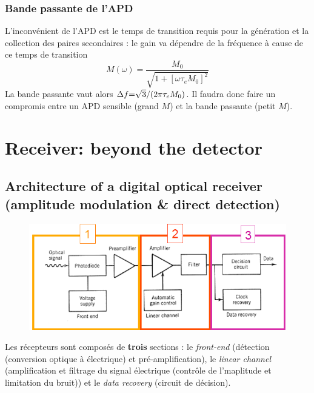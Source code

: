 \subsubsection{Bande passante de l'APD}
L'inconvénient de l'APD est le temps de transition requis pour la génération et la collection 
des paires secondaires : le gain va dépendre de la fréquence à cause de ce temps de transition
\begin{equation}
M(\omega ) = \frac{{{M_0}}}{{\sqrt {1 + {{[\omega {\tau _e}{M_0}]}^2}} }}
\end{equation}
La bande passante vaut alors $\Delta f{\rm{  =  }}\sqrt 3 {\rm{/(}}2\pi {\tau _e}{M_0})$. Il 
faudra donc faire un compromis entre un APD sensible (grand $M$) et la bande passante (petit $M$).

\section{Receiver: beyond the detector}
\subsection{Architecture of a digital optical receiver (amplitude modulation \& direct detection)}
\begin{figure}
\vspace{-5mm}
\includegraphics[scale=0.25]{ch5/image8}
\end{figure}
Les récepteurs sont composés de \textbf{trois} sections : le \textit{front-end} (détection (conversion
optique à électrique) et pré-amplification), le \textit{linear channel} (amplification et filtrage
du signal électrique (contrôle de l'maplitude et limitation du bruit)) et le \textit{data recovery} 
(circuit de décision).

